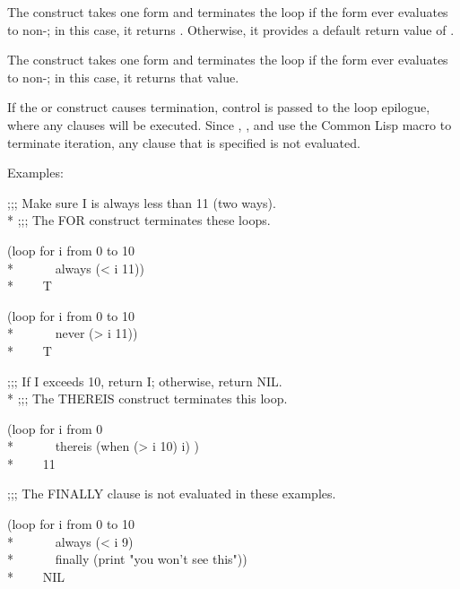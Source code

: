 \begin{new}
\begin{defloop}
  The  construct takes one form and terminates the loop
  if the form ever evaluates to non-; in this case, it returns
  .  Otherwise, it provides a default return value of .

  The  construct takes one form and terminates the loop
  if the form ever evaluates to non-; in this case, it returns
  that value.

If the  or  construct causes termination,
control is passed to the loop epilogue, where any 
clauses will be executed.  Since , , and 
 use the Common Lisp macro  to terminate
iteration, any  clause that is specified is not
evaluated.

Examples:
\begin{lisp}
;;; Make sure I is always less than 11 (two ways). \\*
;;; The FOR construct terminates these loops.
\end{lisp}
\begin{lisp}
(loop for i from 0 to 10 \\*
~~~~~~always (< i 11)) \\*
~~~\EV~T
\end{lisp}
\begin{lisp}
(loop for i from 0 to 10 \\*
~~~~~~never (> i 11)) \\*
~~~\EV~T
\end{lisp}
\begin{lisp}
;;; If I exceeds 10, return I; otherwise, return NIL. \\*
;;; The THEREIS construct terminates this loop.
\end{lisp}
\begin{lisp}
(loop for i from 0 \\*
~~~~~~thereis (when (> i 10) i) ) \\*
~~~\EV~11
\end{lisp}
\begin{lisp}
;;; The FINALLY clause is not evaluated in these examples.
\end{lisp}
\begin{lisp}
(loop for i from 0 to 10 \\*
~~~~~~always (< i 9) \\*
~~~~~~finally (print "you won't see this")) \\*
~~~\EV~NIL
\end{lisp}
\begin{lisp}

\end{lisp}
\end{defloop}
\end{new}
